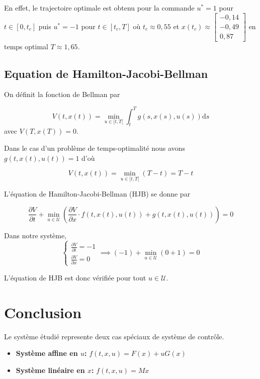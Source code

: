 \documentclass[
  french,
]{article}
\providecommand{\tightlist}{%
  \setlength{\itemsep}{0pt}\setlength{\parskip}{0pt}}
\begin{document}
En effet, le trajectoire optimale est obtenu pour la commande
\(u^*=1\) pour \(t\in[0,t_c]\) puis \(u^*=-1\) pour \(t\in[t_c,T]\)
où \(t_c\approx 0,55\)
et \(x(t_c)\approx\begin{bmatrix}-0,14\\-0,49\\0,87\end{bmatrix}\)
en temps optimal \(T\approx 1,65\).

\hypertarget{equation-de-hamilton-jacobi-bellman}{%
\subsection{Equation de Hamilton-Jacobi-Bellman}\label{equation-de-hamilton-jacobi-bellman}}

On définit la fonction de Bellman par

\[V(t,x(t)) = \min_{u\in[t,T[} \int_t^T g(s, x(s), u(s))\mathrm{d}s\]
avec \(V(T, x(T)) = 0\).

Dans le cas d'un problème de temps-optimalité nous avons
\(g(t, x(t), u(t)) = 1\) d'où

\[V(t, x(t)) = \min_{u\in[t,T[} (T-t) = T-t\]

L'équation de Hamilton-Jacobi-Bellman (HJB) se donne par

\[\frac{\partial V}{\partial t} + \min_{u\in\mathcal{U}}\left(\frac{\partial V}{\partial x}\cdot f(t,x(t),u(t)) + g(t,x(t),u(t))\right) = 0\]

Dans notre système,
\[\begin{cases}
    \frac{\partial V}{\partial t} = -1\\
    \frac{\partial V}{\partial x} = 0
\end{cases}\implies (-1) + \min_{u\in\mathcal{U}}\left(0 + 1\right) = 0\]

L'équation de HJB est donc vérifiée pour tout \(u\in\mathcal{U}\).

\hypertarget{conclusion}{%
\section{Conclusion}\label{conclusion}}

Le système étudié represente deux cas spéciaux de système de contrôle.

\begin{itemize}
\tightlist
\item
  \textbf{Système affine en \(u\):} \(f(t, x, u) = F(x) + uG(x)\)
\item
  \textbf{Système linéaire en \(x\):} \(f(t, x, u) = Mx\)
\end{itemize}
\end{document}
